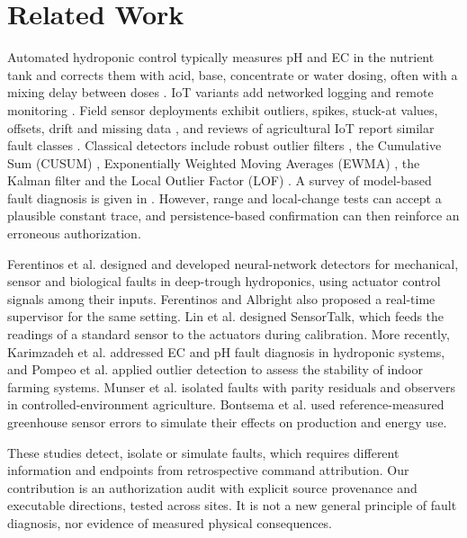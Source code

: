\documentclass[preprint,12pt,doubleblind]{elsarticle}
\begin{document}
\section{Related Work}
\label{sec:related}
Automated hydroponic control typically measures pH and EC in the nutrient tank and corrects them with acid, base, concentrate or water dosing, often with a mixing delay between doses \cite{domingues2012automated}. IoT variants add networked logging and remote monitoring \cite{tatas2022reliable}. Field sensor deployments exhibit outliers, spikes, stuck-at values, offsets, drift and missing data \cite{ni2009faulttypes,sharma2010sensorfaults}, and reviews of agricultural IoT report similar fault classes \cite{zou2023agriiotfaults}. Classical detectors include robust outlier filters \cite{hampel1974influence}, the Cumulative Sum (CUSUM) \cite{page1954continuous,basseville1993detection}, Exponentially Weighted Moving Averages (EWMA) \cite{roberts1959control}, the Kalman filter \cite{kalman1960new} and the Local Outlier Factor (LOF) \cite{breunig2000lof}. A survey of model-based fault diagnosis is given in \cite{isermann2005fault}. However, range and local-change tests can accept a plausible constant trace, and persistence-based confirmation can then reinforce an erroneous authorization.

Ferentinos et al. \cite{ferentinos2003hydroponicfaults} designed and developed neural-network detectors for mechanical, sensor and biological faults in deep-trough hydroponics, using actuator control signals among their inputs. Ferentinos and Albright \cite{ferentinos2003supervision} also proposed a real-time supervisor for the same setting. Lin et al. \cite{lin2019sensortalk} designed SensorTalk, which feeds the readings of a standard sensor to the actuators during calibration. More recently, Karimzadeh et al. \cite{karimzadeh2025hydroponicfaults} addressed EC and pH fault diagnosis in hydroponic systems, and Pompeo et al. \cite{pompeo2025stability} applied outlier detection to assess the stability of indoor farming systems. Munser et al. \cite{munser2026residual} isolated faults with parity residuals and observers in controlled-environment agriculture. Bontsema et al. \cite{bontsema2011sensorerrors} used reference-measured greenhouse sensor errors to simulate their effects on production and energy use.

These studies detect, isolate or simulate faults, which requires different information and endpoints from retrospective command attribution. Our contribution is an authorization audit with explicit source provenance and executable directions, tested across sites. It is not a new general principle of fault diagnosis, nor evidence of measured physical consequences.
\end{document}
